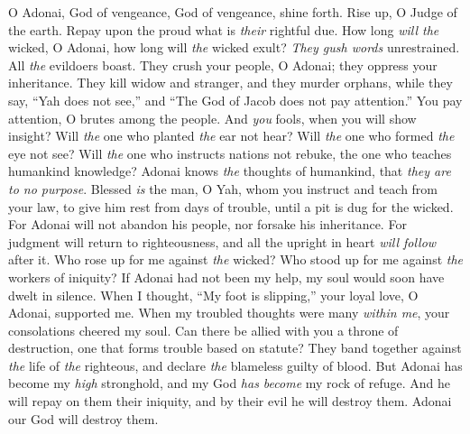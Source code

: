 \begin{biblechapter} %
 O Adonai, God of vengeance, 
God of vengeance, shine forth.
\verse Rise up, O Judge of the earth. 
Repay upon the proud what is \textit{their} rightful due.
\verse How long \textit{will the} wicked, O Adonai, 
how long will \textit{the} wicked exult?
\verse \textit{They gush words} unrestrained. 
All \textit{the} evildoers boast.
\verse They crush your people, O Adonai; 
they oppress your inheritance.
\verse They kill widow and stranger, 
and they murder orphans,
\verse while they say, “Yah does not see,” 
and “The God of Jacob does not pay attention.”
\verse You pay attention, O brutes among the people. 
And \textit{you} fools, when you will show insight?
\verse Will \textit{the} one who planted \textit{the} ear not hear? 
Will \textit{the} one who formed \textit{the} eye not see?
\verse Will \textit{the} one who instructs nations not rebuke, 
the one who teaches humankind knowledge?
\verse Adonai knows \textit{the} thoughts of humankind, 
that \textit{they \textit{are} to no purpose}.
\verse Blessed \textit{is} the man, O Yah, whom you instruct 
and teach from your law,
\verse to give him rest from days of trouble, 
until a pit is dug for the wicked.
\verse For Adonai will not abandon his people, 
nor forsake his inheritance.
\verse For judgment will return to righteousness, 
and all the upright in heart \textit{will follow} after it.
\verse Who rose up for me against \textit{the} wicked? 
Who stood up for me against \textit{the} workers of iniquity?
\verse If Adonai had not been my help, 
my soul would soon have dwelt in silence.
\verse When I thought, “My foot is slipping,” 
your loyal love, O Adonai, supported me.
\verse When my troubled thoughts were many \textit{within me}, 
your consolations cheered my soul.
\verse Can there be allied with you a throne of destruction, 
one that forms trouble based on statute?
\verse They band together against \textit{the} life of \textit{the} righteous, 
and declare \textit{the} blameless guilty of blood.
\verse But Adonai has become my \textit{high} stronghold, 
and my God \textit{has become} my rock of refuge.
\verse And he will repay on them their iniquity, 
and by their evil he will destroy them. 
Adonai our God will destroy them.
\end{biblechapter}

